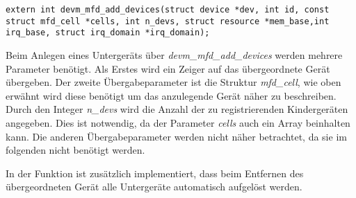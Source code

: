 \begin{lstfloat}
\begin{lstlisting}
extern int devm_mfd_add_devices(struct device *dev, int id, const struct mfd_cell *cells, int n_devs, struct resource *mem_base,int irq_base, struct irq_domain *irq_domain);
\end{lstlisting}
\end{lstfloat}

Beim Anlegen eines Untergeräts über \textit{devm\_mfd\_add\_devices} werden mehrere Parameter benötigt. 
Als Erstes wird ein Zeiger auf das übergeordnete Gerät übergeben. Der zweite Übergabeparameter ist die Struktur \textit{mfd\_cell}, wie oben erwähnt wird diese benötigt um das anzulegende Gerät näher zu beschreiben.
Durch den Integer \textit{n\_devs} wird die Anzahl der zu registrierenden Kindergeräten angegeben. Dies ist notwendig, da der Parameter \textit{cells} auch ein Array beinhalten kann. 
Die anderen Übergabeparameter werden nicht näher betrachtet, da sie im folgenden nicht benötigt werden. \cite[mfd/mfd-core.h]{linuxsourcedriver}


In der Funktion ist zusätzlich implementiert, dass beim Entfernen des übergeordneten Gerät alle Untergeräte automatisch aufgelöst werden. \cite[mfd/mfd-core.h, Zeile 356f.]{linuxsourcedriver}



